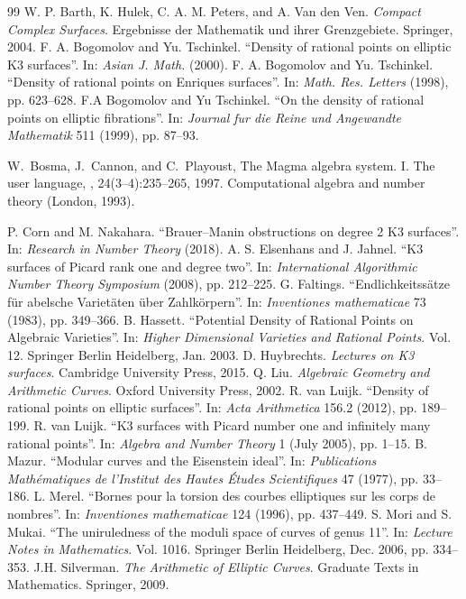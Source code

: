 \begin{thebibliography}{99}
{}
W. P. Barth, K. Hulek, C. A. M. Peters, and A. Van den Ven. \emph{Compact
Complex Surfaces}. Ergebnisse der Mathematik und ihrer Grenzgebiete. Springer, 2004.
{}
F. A. Bogomolov and Yu. Tschinkel. “Density of rational points on elliptic K3 surfaces”.
In: \emph{Asian J. Math.} (2000).
{}
F. A. Bogomolov and Yu. Tschinkel. “Density of rational points on Enriques surfaces”.
In: \emph{Math. Res. Letters} (1998), pp. 623–628.
{}
F.A Bogomolov and Yu Tschinkel. “On the density of rational points on elliptic
fibrations”. In: \emph{Journal fur die Reine und Angewandte Mathematik} 511 (1999),
pp. 87–93.
{}

W.~Bosma, J.~Cannon, and C.~Playoust,
\newblock The Magma algebra system. I. The user language,
, 24(3--4):235--265, 1997.
\newblock Computational algebra and number theory (London, 1993).

P. Corn and M. Nakahara. “Brauer–Manin obstructions on degree 2 K3 surfaces”. In:
\emph{Research in Number Theory} (2018).
{}
A. S. Elsenhans and J. Jahnel. “K3 surfaces of Picard rank one and degree two”. In:
\emph{International Algorithmic Number Theory Symposium} (2008), pp. 212–225.
{}
G. Faltings. “Endlichkeitssätze für abelsche Varietäten über Zahlkörpern”. In:
\emph{Inventiones mathematicae} 73 (1983), pp. 349–366.
{}
B. Hassett. “Potential Density of Rational Points on Algebraic Varieties”. In:
\emph{Higher Dimensional Varieties and Rational Points}. Vol. 12. Springer Berlin
Heidelberg, Jan. 2003.
{}
D. Huybrechts. \emph{Lectures on K3 surfaces}. Cambridge University Press, 2015.
{}
Q. Liu. \emph{Algebraic Geometry and Arithmetic Curves}. Oxford University Press,
2002.
{}
R. van Luijk. “Density of rational points on elliptic surfaces”. In: \emph{Acta
Arithmetica} 156.2 (2012), pp. 189–199.
{}
R. van Luijk. “K3 surfaces with Picard number one and infinitely many rational
points”. In: \emph{Algebra and Number Theory} 1 (July 2005), pp. 1–15.
{}
B. Mazur. “Modular curves and the Eisenstein ideal”. In: \emph{Publications
Mathématiques de l’Institut des Hautes Études Scientifiques} 47 (1977), pp. 33–186.
{}
L. Merel. “Bornes pour la torsion des courbes elliptiques sur les corps de nombres”. In:
\emph{Inventiones mathematicae} 124 (1996), pp. 437–449.
{}
S. Mori and S. Mukai. “The uniruledness of the moduli space of curves of genus 11”. In:
\emph{Lecture Notes in Mathematics}. Vol. 1016. Springer Berlin Heidelberg, Dec. 2006,
pp. 334–353.
{}
J.H. Silverman. \emph{The Arithmetic of Elliptic Curves}. Graduate Texts in
Mathematics. Springer, 2009.
\end{thebibliography}
